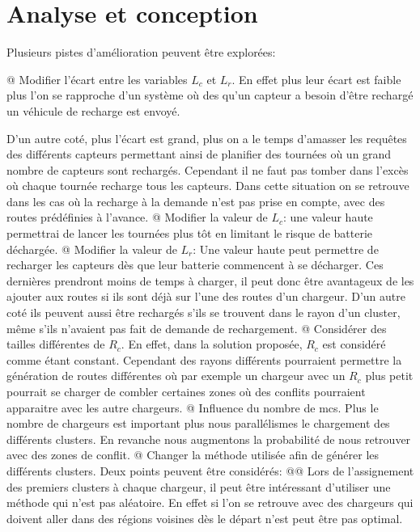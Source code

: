 \documentclass[noposter]{polytech}
\begin{document}
\chapter{Analyse et conception}
	Plusieurs pistes d'amélioration peuvent être explorées:
	\begin{easylist}
		@ Modifier l'écart entre les variables $L_c$ et $L_r$.
		En effet plus leur écart est faible plus l'on se rapproche d'un système où des qu'un capteur a besoin d'être rechargé un véhicule de recharge est envoyé.
		
		D'un autre coté, plus l'écart est grand, plus on a le temps d'amasser les requêtes des différents capteurs permettant ainsi de planifier des tournées où un grand nombre de capteurs sont rechargés.
		Cependant il ne faut pas tomber dans l'excès où chaque tournée recharge tous les capteurs.
		Dans cette situation on se retrouve dans les cas où la recharge à la demande n'est pas prise en compte, avec des routes prédéfinies à l'avance.
		@ Modifier la valeur de $L_c$: une valeur haute permettrai de lancer les tournées plus tôt en limitant le risque de batterie déchargée.
		@ Modifier la valeur de $L_r$: Une valeur haute peut permettre de recharger les capteurs dès que leur batterie commencent à se décharger.
		Ces dernières prendront moins de temps à charger, il peut donc être avantageux de les ajouter aux routes si ils sont déjà sur l'une des routes d'un chargeur.
		D'un autre coté ils peuvent aussi être rechargés s'ils se trouvent dans le rayon d'un cluster, même s'ils n'avaient pas fait de demande de rechargement.
		@ Considérer des tailles différentes de $R_c$.
		En effet, dans la solution proposée, $R_c$ est considéré comme étant constant.
		Cependant des rayons différents pourraient permettre la génération de routes différentes où par exemple un chargeur avec un $R_c$ plus petit pourrait se charger de combler certaines zones où des conflits pourraient apparaitre avec les autre chargeurs.
		@ Influence du nombre de \glspl{mc}.
		Plus le nombre de chargeurs est important plus nous parallélismes le chargement des différents clusters.
		En revanche nous augmentons la probabilité de nous retrouver avec des zones de conflit.
		@ Changer la méthode utilisée afin de générer les différents clusters.
		Deux points peuvent être considérés:
		@@ Lors de l'assignement des premiers clusters à chaque chargeur, il peut être intéressant d'utiliser une méthode qui n'est pas aléatoire.
		En effet si l'on se retrouve avec des chargeurs qui doivent aller dans des régions voisines dès le départ n'est peut être pas optimal.

\end{easylist}
\end{document}
